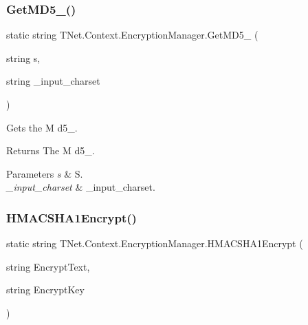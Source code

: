 \subsubsection{\texorpdfstring{Get\+M\+D5\+\_()}{GetMD5\_32()}}
{\footnotesize\ttfamily static string T\+Net.\+Context.\+Encryption\+Manager.\+Get\+M\+D5\+\_ (\begin{DoxyParamCaption}\item[{string}]{s,  }\item[{string}]{\+\_\+input\+\_\+charset }\end{DoxyParamCaption})\hspace{0.3cm}{\ttfamily [static]}}



Gets the M d5\+\_. 

\begin{DoxyReturn}{Returns}
The M d5\+\_.
\end{DoxyReturn}

\begin{DoxyParams}{Parameters}
{\em s} & S.\\
\hline
{\em \+\_\+input\+\_\+charset} & \+\_\+input\+\_\+charset.\\
\hline
\end{DoxyParams}
\mbox{\label{class_t_net_1_1_context_1_1_encryption_manager_a08c2a9203e621642c3c80e314c56dae9}} 
\subsubsection{\texorpdfstring{H\+M\+A\+C\+S\+H\+A1\+Encrypt()}{HMACSHA1Encrypt()}}
{\footnotesize\ttfamily static string T\+Net.\+Context.\+Encryption\+Manager.\+H\+M\+A\+C\+S\+H\+A1\+Encrypt (\begin{DoxyParamCaption}\item[{string}]{Encrypt\+Text,  }\item[{string}]{Encrypt\+Key }\end{DoxyParamCaption})\hspace{0.3cm}{\ttfamily [static]}}



